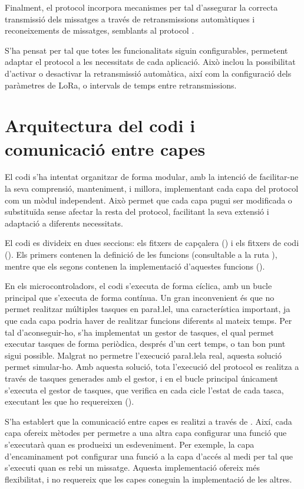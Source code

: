 \documentclass{tfgitic}[2024/07/01]
\begin{document}
Finalment, el protocol incorpora mecanismes per tal d'assegurar la correcta transmissió dels missatges a través de retransmissions automàtiques i reconeixements de missatges, semblants al protocol .

S'ha pensat per tal que totes les funcionalitats siguin configurables, permetent adaptar el protocol a les necessitats de cada aplicació. Això inclou la possibilitat d'activar o desactivar la retransmissió automàtica, així com la configuració dels paràmetres de LoRa, o intervals de temps entre retransmissions.

\section{Arquitectura del codi i comunicació entre capes}
El codi s'ha intentat organitzar de forma modular, amb la intenció de facilitar-ne la seva comprensió, manteniment, i millora, implementant cada capa del protocol com un mòdul independent. Això permet que cada capa pugui ser modificada o substituïda sense afectar la resta del protocol, facilitant la seva extensió i adaptació a diferents necessitats.

El codi es divideix en dues seccions: els fitxers de capçalera () i els fitxers de codi (). Els primers contenen la definició de les funcions (consultable a la ruta ), mentre que els segons contenen la implementació d'aquestes funcions ().

En els microcontroladors, el codi s'executa de forma cíclica, amb un bucle principal que s'executa de forma contínua. Un gran inconvenient és que no permet realitzar múltiples tasques en para\l.lel, una característica important, ja que cada capa podria haver de realitzar funcions diferents al mateix temps. Per tal d'aconseguir-ho, s'ha implementat un gestor de tasques, el qual permet executar tasques de forma periòdica, després d'un cert temps, o tan bon punt sigui possible. Malgrat no permetre l'execució para\l.lela real, aquesta solució permet simular-ho.
Amb aquesta solució, tota l'execució del protocol es realitza a través de tasques generades amb el gestor, i en el bucle principal únicament s'executa el gestor de tasques, que verifica en cada cicle l'estat de cada tasca, executant les que ho requereixen ().

S'ha establert que la comunicació entre capes es realitzi a través de . Així, cada capa ofereix mètodes per permetre a una altra capa configurar una funció que s'executarà quan es produeixi un esdeveniment. Per exemple, la capa d'encaminament pot configurar una funció a la capa d'accés al medi per tal que s'executi quan es rebi un missatge. Aquesta implementació ofereix més flexibilitat, i no requereix que les capes coneguin la implementació de les altres.
\end{document}

